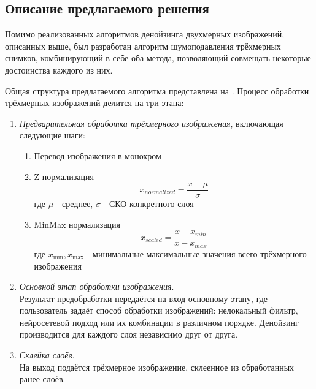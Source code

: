 \subsection{Описание предлагаемого решения}
\par Помимо реализованных алгоритмов денойзинга двухмерных изображений, описанных выше, был разработан алгоритм шумоподавления трёхмерных снимков, комбинирующий в себе оба метода, позволяющий совмещать некоторые достоинства каждого из них.
\par Общая структура предлагаемого алгоритма представлена на . Процесс обработки трёхмерных изображений делится на три этапа:
\begin{enumerate}[]
	\item \textit{Предварительная обработка трёхмерного изображения}, включающая следующие шаги:\\
	\begin{enumerate}[]
		\item Перевод изображения в монохром
		\item Z-нормализация
		\begin{equation}
			x_{normalized} = \frac{x-\mu}{\sigma}
		\end{equation}
		где $\mu$ - среднее, $\sigma$ - СКО конкретного слоя
		\item MinMax нормализация
		\begin{equation}
			x_{scaled} = \frac{x - x_{min}}{x - x_{max}}
		\end{equation}
		где $x_{\min}, x_{\max}$ - минимальные максимальные значения всего трёхмерного изображения
	\end{enumerate}
	\item \textit{Основной этап обработки изображения}.\\ Результат предобработки передаётся на вход основному этапу, где пользователь задаёт способ обработки изображений: нелокальный фильтр, нейросетевой подход или их комбинации в различном порядке. Денойзинг производится для каждого слоя независимо друг от друга.
	\item \textit{Склейка слоёв}.\\ На выход подаётся трёхмерное изображение, склеенное из обработанных ранее слоёв.
\end{enumerate}
